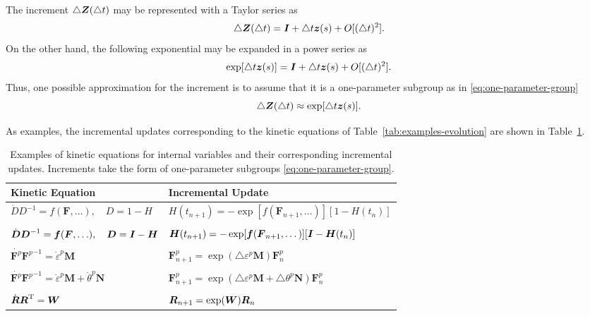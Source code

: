 \documentclass[12pt]{article}
\newcommand{\mbs}[1]{\boldsymbol{#1}}
\def\bD{{\mbs{D}}} \def\bE{{\mbs{E}}} \def\bF{{\mbs{F}}}
\def\bM{{\mbs{M}}} \def\bN{{\mbs{N}}} \def\bO{{\mbs{O}}}
\begin{document}
The increment $\triangle \bZ(\triangle t)$ may be represented with a Taylor
series as
\begin{equation}
  \triangle \bZ(\triangle t)  =
  \bI + \triangle t \bz(s) + O[(\triangle t)^2].
  \label{eq:Taylor-series}
\end{equation}
On the other hand, the following exponential may be expanded in a
power series as
\begin{equation}
  \exp[\triangle t \bz(s)] =
  \bI + \triangle t \bz(s) + O[(\triangle t)^2].
  \label{eq:power-series}
\end{equation}
Thus, one possible approximation for the increment is to assume
that it is a one-parameter subgroup as in \eqref{eq:one-parameter-group}
\begin{equation}
  \triangle \bZ(\triangle t) \approx
  \exp[\triangle t \bz(s)].
  \label{eq:increment}
\end{equation}

As examples, the incremental updates corresponding to the kinetic
equations of Table~\ref{tab:examples-evolution} are shown in
Table~\ref{tab:examples-increment}.

\begin{table}[htbp]
  \begin{center}
    \begin{tabular}{ l l }
      \toprule
      Kinetic Equation
      &
      Incremental Update
      \\
      \hline
      $\dot{D} D^{-1} =
        f(\bF,\ldots),\quad D = 1 - H$
      &
      $H(t_{n+1}) = - \exp[f(\bF_{n+1}, \dots)] [1 - H(t_{n})]$
      \\
      \\
      $\dot{\bD}\bD^{-1} =
      \fb(\bF,\ldots), \quad \bD = \bI - \bH$
      &
      $\bH(t_{n+1}) = - \exp[\fb(\bF_{n+1}, \dots)] [\bI - \bH(t_{n})]$
      \\
      \\
      $\dot{\bF^p} {\bF^p}^{-1} = \dot{\varepsilon}^p \bM$
      &
      $\bF^p_{n+1} = \exp(\triangle \varepsilon^p \bM) \bF^p_{n}$
      \\
      \\
      $\dot{\bF^p} {\bF^p}^{-1} = \dot{\varepsilon}^p \bM +
      \dot{\theta}^p \bN$
      &
      $\bF^p_{n+1} =
      \exp(\triangle \varepsilon^p \bM + \triangle
      \theta^p \bN) \bF^p_{n}$
      \\
      \\
      $\dot{\bR} {\bR}^{\text{T}} = \bW$
      &
      $\bR_{n+1} = \exp(\bW) \bR_{n}$
      \\
      \bottomrule
    \end{tabular}
    \caption{Examples of kinetic equations for internal variables and
      their corresponding incremental updates. Increments take the
      form of one-parameter subgroups \eqref{eq:one-parameter-group}.}
    \label{tab:examples-increment}
  \end{center}
\end{table}
\end{document}
